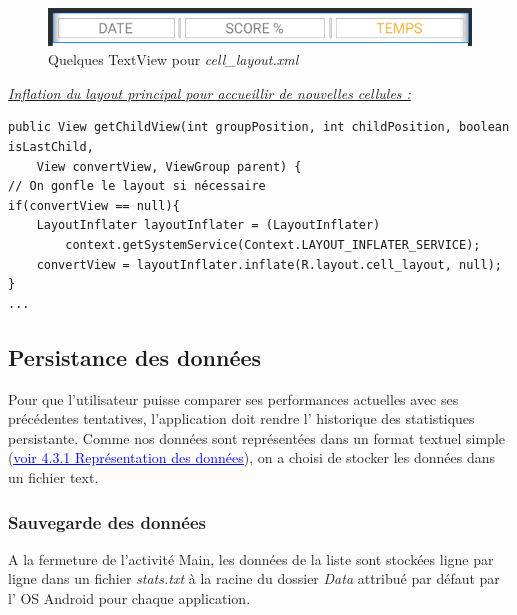 \documentclass{article}
\begin{document}
\begin{figure}[H]
    \centering
    \includegraphics[width=0.7\linewidth]{androidCellLayout.png}
    \caption{Quelques TextView pour \textit{cell\_layout.xml}}
\end{figure}

\noindent\underline{\textit{Inflation du layout principal pour accueillir de nouvelles cellules :}}
\begin{verbatim}
public View getChildView(int groupPosition, int childPosition, boolean isLastChild, 
    View convertView, ViewGroup parent) {
// On gonfle le layout si nécessaire
if(convertView == null){
    LayoutInflater layoutInflater = (LayoutInflater) 
        context.getSystemService(Context.LAYOUT_INFLATER_SERVICE);
    convertView = layoutInflater.inflate(R.layout.cell_layout, null);
}
...
\end{verbatim}

\subsection{Persistance des données}
Pour que l'utilisateur puisse comparer ses performances actuelles avec ses précédentes tentatives, l'application doit rendre l' historique des statistiques persistante. Comme nos données sont représentées dans un format textuel simple (\hyperref[section:dataformat]{\textcolor{blue}{\underline{voir 4.3.1  Représentation des données}}}), on a choisi de stocker les données dans un fichier text.

\subsubsection{Sauvegarde des données}
A la fermeture de l'activité Main, les données de la liste sont stockées ligne par ligne dans un fichier \textit{stats.txt} à la racine du dossier \textit{Data} attribué par défaut par l' OS Android pour chaque application.\\
\end{document}
